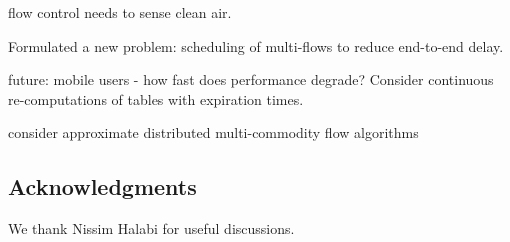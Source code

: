 \documentclass[12pt]{article}
\newenvironment{proof sketch}[1]{\noindent {\emph{Proof sketch of #1:}}}{\hfill \qed}
\begin{document}
flow control needs to sense clean air.

Formulated a new problem: scheduling of multi-flows to reduce
end-to-end delay.

future:
mobile users - how fast does performance degrade?
Consider continuous re-computations of tables with expiration times.

consider approximate distributed multi-commodity flow algorithms


%
\ifnum{}
  \subsection*{Acknowledgments}
  We thank Nissim Halabi for useful discussions.
\fi
%




\newpage
\appendix
\end{document}
